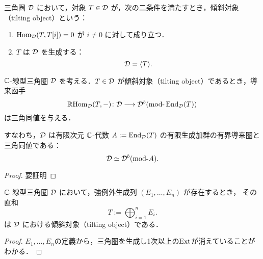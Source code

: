 \begin{defn}[傾斜対象]\cite{BK89}
\label{defn:tilting object}
三角圏 \({\mathcal D}\) において，対象 \(T \in {\mathcal D}\) が，次の二条件を満たすとき，傾斜対象（tilting object）という：
\begin{enumerate}
  \item \(\operatorname{\mathrm{Hom}}_{{\mathcal D}}(T, T[i]) = 0\) が \(i \ne 0\) に対して成り立つ．
  \item \(T\) は \({\mathcal D}\) を生成する：
  \[
  {\mathcal D} = \langle T \rangle.
  \]
\end{enumerate}

\end{defn}

\begin{thm}\cite{BK89}
\label{thm:derived_equivalence_tilting}
\({\mathbb C}\)-線型三角圏 \({\mathcal D}\) を考える．\(T \in {\mathcal D}\) が傾斜対象（tilting object）であるとき，導来函手
\[
\RHom_{\D}(T, -) \colon \D \longrightarrow \D^b(\mod \End_{\D}(T))
\]
は三角同値を与える．

すなわち，\({\mathcal D}\) は有限次元 \({\mathbb C}\)-代数 \(A := \operatorname{\mathrm{End}}_{{\mathcal D}}(T)\) の有限生成加群の有界導来圏と三角同値である：
\[
\D \simeq \D^b(\mod A).
\]
\end{thm}


\begin{proof}
{\color{red}要証明}
\end{proof}

\begin{thm}\cite{BK89}
\label{thm:tilting_from_exceptional}
\({\mathbb C}\) 線型三角圏 \({\mathcal D}\) において，強例外生成列 \((E_1, \dots, E_n)\) が存在するとき，
その直和
\[
T := \bigoplus_{i=1}^n E_i.
\]
は \({\mathcal D}\) における傾斜対象（tilting object）である．
\end{thm}
\begin{proof}
	$E_1,\ldots,E_n$の定義から，三角圏を生成し1次以上の$\operatorname{\mathrm{Ext}}$が消えていることがわかる．
\end{proof}
